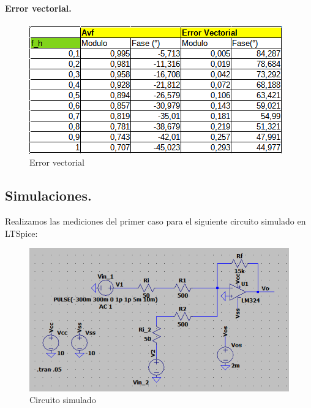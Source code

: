 \documentclass[11pt, a4paper]{article}
\begin{document}
\paragraph{}
\textbf{Error vectorial.} 
\paragraph{}
\begin{figure}[h!]
    \centering
    \includegraphics{Imagenes/tabla1.png}
    \caption{Error vectorial}
    \label{fig:enter-label}
\end{figure}



\subsection{Simulaciones.}
\onehalfspacing
Realizamos las mediciones del primer caso para el siguiente circuito simulado en LTSpice:
\begin{figure}[h!]
    \centering
    \includegraphics[scale=0.8]{Imagenes/CircSim2.png}
    \caption{Circuito simulado}
    \label{fig:enter-label}
\end{figure}
\end{document}
